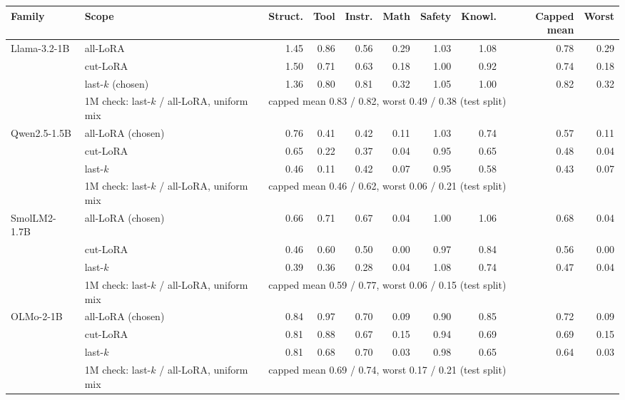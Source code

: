 \begin{tabular}{llrrrrrrrr}
\toprule
Family & Scope & Struct. & Tool & Instr. & Math & Safety & Knowl. & Capped mean & Worst \\
\midrule
Llama-3.2-1B & all-LoRA & 1.45 & 0.86 & 0.56 & 0.29 & 1.03 & 1.08 & 0.78 & 0.29 \\
 & cut-LoRA & 1.50 & 0.71 & 0.63 & 0.18 & 1.00 & 0.92 & 0.74 & 0.18 \\
 & last-$k$ (chosen) & 1.36 & 0.80 & 0.81 & 0.32 & 1.05 & 1.00 & 0.82 & 0.32 \\
 & 1M check: last-$k$ / all-LoRA, uniform mix & \multicolumn{8}{l}{capped mean 0.83 / 0.82, worst 0.49 / 0.38 (test split)} \\
\midrule
Qwen2.5-1.5B & all-LoRA (chosen) & 0.76 & 0.41 & 0.42 & 0.11 & 1.03 & 0.74 & 0.57 & 0.11 \\
 & cut-LoRA & 0.65 & 0.22 & 0.37 & 0.04 & 0.95 & 0.65 & 0.48 & 0.04 \\
 & last-$k$ & 0.46 & 0.11 & 0.42 & 0.07 & 0.95 & 0.58 & 0.43 & 0.07 \\
 & 1M check: last-$k$ / all-LoRA, uniform mix & \multicolumn{8}{l}{capped mean 0.46 / 0.62, worst 0.06 / 0.21 (test split)} \\
\midrule
SmolLM2-1.7B & all-LoRA (chosen) & 0.66 & 0.71 & 0.67 & 0.04 & 1.00 & 1.06 & 0.68 & 0.04 \\
 & cut-LoRA & 0.46 & 0.60 & 0.50 & 0.00 & 0.97 & 0.84 & 0.56 & 0.00 \\
 & last-$k$ & 0.39 & 0.36 & 0.28 & 0.04 & 1.08 & 0.74 & 0.47 & 0.04 \\
 & 1M check: last-$k$ / all-LoRA, uniform mix & \multicolumn{8}{l}{capped mean 0.59 / 0.77, worst 0.06 / 0.15 (test split)} \\
\midrule
OLMo-2-1B & all-LoRA (chosen) & 0.84 & 0.97 & 0.70 & 0.09 & 0.90 & 0.85 & 0.72 & 0.09 \\
 & cut-LoRA & 0.81 & 0.88 & 0.67 & 0.15 & 0.94 & 0.69 & 0.69 & 0.15 \\
 & last-$k$ & 0.81 & 0.68 & 0.70 & 0.03 & 0.98 & 0.65 & 0.64 & 0.03 \\
 & 1M check: last-$k$ / all-LoRA, uniform mix & \multicolumn{8}{l}{capped mean 0.69 / 0.74, worst 0.17 / 0.21 (test split)} \\
\bottomrule
\end{tabular}

